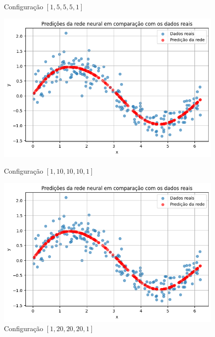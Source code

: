 \begin{figure}[htb]
	\centering
	\begin{minipage}{0.45\textwidth}
		\centering
		\caption{Configuração $[1, 5, 5, 5, 1]$}\label{fig:tarefa04:5:predicoes}
		
		\includegraphics[width=\textwidth]{./0803_imgs/0052_tarefa04/png-241110-190441034-11876360900706154495.png}
	\end{minipage}
	\hfill
	\begin{minipage}{0.45\textwidth}
		\centering
		\caption{Configuração $[1, 10, 10, 10, 
		1]$}\label{fig:tarefa04:10:predicoes}
		
		\includegraphics[width=\textwidth]{./0803_imgs/0052_tarefa04/png-241110-190600007-13238267918468901506.png}
	\end{minipage}
	\vspace{2Ex}
	\begin{minipage}{0.45\textwidth}
		\centering
		\caption{Configuração $[1, 20, 20, 20, 
		1]$}\label{fig:tarefa04:20:predicoes}
		

\end{minipage}
\end{figure}
